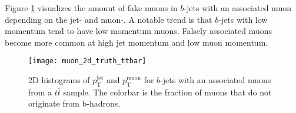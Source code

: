 Figure \ref{fig:muon_2d_truth} visualizes the amount of fake muons in $b$-jets with an associated muon depending on the jet- and muon-\pt. A notable trend is that $b$-jets with low momentum tend to have low momentum muons. Falsely associated muons become more common at high jet momentum and low muon momentum.
\begin{figure}[]
  \texttt{[image: muon\_2d\_truth\_ttbar]}
  \caption{2D histograms of $p_\mathrm{T}^\mathrm{jet}$ and $p_\mathrm{T}^\mathrm{muon}$ for $b$-jets with an associated muons from a $t\bar{t}$ sample. The colorbar is the fraction of muons that do not originate from b-hadrons. }
  \label{fig:muon_2d_truth}
\end{figure}



